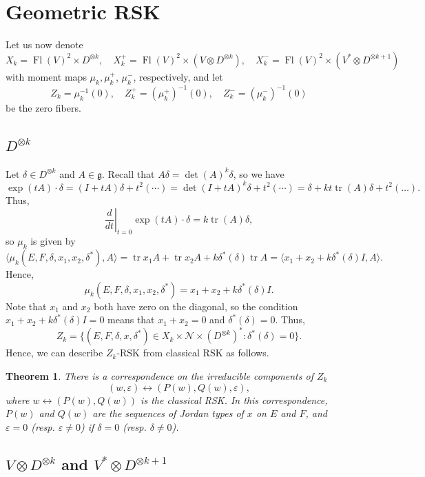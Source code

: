\documentclass[12pt,a4paper]{article}
\def\Fl{\operatorname{Fl}}
\def\tr{\operatorname{tr}}
\theoremstyle{plain}
\newtheorem{thm}{Theorem}[section]
\theoremstyle{definition}
\theoremstyle{remark}
\newcommand{\cN}{\mathcal{N}}
\def\gfrak{\mathfrak{g}}
\newcommand{\eps}{\varepsilon}
\begin{document}
\section{Geometric RSK}

    Let us now denote
    \[
    X_k = \Fl(V)^2 \times D^{\otimes k},\quad
    X^+_k = \Fl(V)^2 \times (V\otimes D^{\otimes k}),\quad
    X^-_k = \Fl(V)^2 \times (V^*\otimes D^{\otimes k+1})
    \]
    with moment maps $\mu_k,\mu^+_k$, $\mu^-_k$, respectively, and let
    \[
    Z_k = \mu_k^{-1}(0),\quad Z^+_k = (\mu^+_k)^{-1}(0),\quad Z^-_k = (\mu^-_k)^{-1}(0)
    \]
    be the zero fibers.

\subsection{$D^{\otimes k}$}

    Let $\delta \in D^{\otimes k}$ and $A\in \gfrak$. Recall that $A\delta = \det(A)^k\delta$, so we have
    \[
    \exp(tA)\cdot \delta = (I+tA)\delta + t^2(\cdots) = \det(I+tA)^k\delta + t^2(\cdots) = \delta + kt\tr(A)\delta + t^2(\ldots).
    \]
    Thus,
    \[
    \left.\dfrac{d}{dt}\right|_{t=0} \exp(tA)\cdot \delta = k\tr(A)\delta,
    \]
    so $\mu_k$ is given by
    \[
    \langle \mu_k(E,F,\delta,x_1,x_2,\delta^*), A \rangle = \tr x_1 A + \tr x_2A + k\delta^*(\delta)\tr A = \langle x_1 + x_2 + k\delta^*(\delta)I ,A \rangle.
    \]
    Hence,
    \[
    \mu_k(E,F,\delta,x_1,x_2,\delta^*) = x_1 + x_2 + k\delta^*(\delta)I.
    \]
    Note that $x_1$ and $x_2$ both have zero on the diagonal, so the condition $x_1 + x_2 + k\delta^*(\delta)I = 0$ means that $x_1 + x_2 = 0$ and $\delta^*(\delta) = 0$. Thus,
    \[
    Z_k = \{(E,F,\delta,x,\delta^*)\in X_k\times \cN \times (D^{\otimes k})^*:\delta^*(\delta) = 0\}.
    \]
    Hence, we can describe $Z_k$-RSK from classical RSK as follows.

    \begin{thm}\label{thm:DkRSK}
        There is a correspondence on the irreducible components of $Z_k$
        \[
        (w,\eps)\longleftrightarrow (P(w),Q(w),\eps),
        \]
        where $w\longleftrightarrow (P(w),Q(w))$ is the classical RSK. In this correspondence, $P(w)$ and $Q(w)$ are the sequences of Jordan types of $x$ on $E$ and $F$, and $\eps = 0$ (resp. $\eps \neq 0$) if $\delta = 0$ (resp. $\delta \neq 0$).
    \end{thm}

\subsection{$V\otimes D^{\otimes k}$ and $V^* \otimes D^{\otimes k+1}$}
\end{document}
